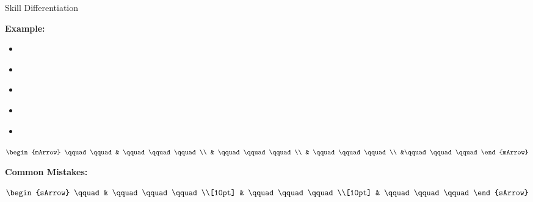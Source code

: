 \begin{boxSkill}{Skill \thenskill \quad Differentiation}
    \noindent%

	\textbf{Example:}
	\begin{itemize}[leftmargin=0.8cm]
	     \item[] $\qquad\qquad\qquad    $
	     \item[] $\qquad\qquad\qquad     $
	     \item[] $\qquad\qquad\qquad      $ 
	     \item[] $\qquad\qquad\qquad    $
	     \item[] $\qquad\qquad\qquad  $	 
	\end{itemize}
	
	 $\begin{mArrow}
        \qquad \qquad &    \qquad\qquad\qquad          \\
                      & \qquad\qquad\qquad \\
			          & \qquad\qquad\qquad  \\
			          &\qquad\qquad\qquad
 	 \end{mArrow}$\\[0.5cm]
	 
	
	\tcbline
	
    \textbf{Common Mistakes:}\\[0.6cm]
	\begin{warningEnv}
	    $\begin{sArrow}
	        \qquad   & \qquad\qquad\qquad \\[10pt]
	  	             & \qquad\qquad\qquad                                                                        \\[10pt] 
                     & \qquad\qquad\qquad 				   
		 \end{sArrow}$		   
    \end{warningEnv}
\end{boxSkill}

